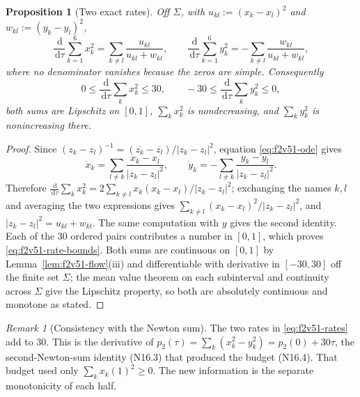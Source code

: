 \documentclass[11pt]{article}
\newtheorem{proposition}[theorem]{Proposition}
\theoremstyle{definition}
\theoremstyle{remark}
\newtheorem{remark}[theorem]{Remark}
\newcommand{\dd}{\,\mathrm d}
\begin{document}
\begin{proposition}[Two exact rates]
\label{prop:f2v51-rates}
Off \(\Sigma\), with \(u_{kl}:=(x_k-x_l)^2\) and \(w_{kl}:=(y_k-y_l)^2\),
\begin{equation}
 \frac{\dd}{\dd\tau}\sum_{k=1}^6x_k^2
 =\sum_{k\ne l}\frac{u_{kl}}{u_{kl}+w_{kl}},
 \qquad
 \frac{\dd}{\dd\tau}\sum_{k=1}^6y_k^2
 =-\sum_{k\ne l}\frac{w_{kl}}{u_{kl}+w_{kl}},
 \label{eq:f2v51-rates}
\end{equation}
where no denominator vanishes because the zeros are simple.
Consequently
\begin{equation}
 0\le\frac{\dd}{\dd\tau}\sum_kx_k^2\le30,
 \qquad
 -30\le\frac{\dd}{\dd\tau}\sum_ky_k^2\le0,
 \label{eq:f2v51-rate-bounds}
\end{equation}
both sums are Lipschitz on \([0,1]\), \(\sum_kx_k^2\) is nondecreasing,
and \(\sum_ky_k^2\) is nonincreasing there.
\end{proposition}

\begin{proof}
Since \((z_k-z_l)^{-1}=(\overline{z_k}-\overline{z_l})/|z_k-z_l|^2\),
equation \eqref{eq:f2v51-ode} gives
\[
 \dot x_k=\sum_{l\ne k}\frac{x_k-x_l}{|z_k-z_l|^2},
 \qquad
 \dot y_k=-\sum_{l\ne k}\frac{y_k-y_l}{|z_k-z_l|^2}.
\]
Therefore
\(\frac{\dd}{\dd\tau}\sum_kx_k^2
 =2\sum_{k\ne l}x_k(x_k-x_l)/|z_k-z_l|^2\); exchanging the names
\(k,l\) and averaging the two expressions gives
\(\sum_{k\ne l}(x_k-x_l)^2/|z_k-z_l|^2\), and
\(|z_k-z_l|^2=u_{kl}+w_{kl}\).  The same computation with \(y\) gives
the second identity.  Each of the \(30\) ordered pairs contributes a
number in \([0,1]\), which proves \eqref{eq:f2v51-rate-bounds}.  Both
sums are continuous on \([0,1]\) by
Lemma~\ref{lem:f2v51-flow}(iii) and differentiable with derivative in
\([-30,30]\) off the finite set \(\Sigma\); the mean value theorem on each
subinterval and continuity across \(\Sigma\) give the Lipschitz property,
so both are absolutely continuous and monotone as stated.
\end{proof}

\begin{remark}[Consistency with the Newton sum]
The two rates in \eqref{eq:f2v51-rates} add to \(30\).  This is the
derivative of \(p_2(\tau)=\sum_k(x_k^2-y_k^2)=p_2(0)+30\tau\), the
second-Newton-sum identity \textup{(N16.3)} that produced the budget
\textup{(N16.4)}.  That budget used only \(\sum_kx_k(1)^2\ge0\).  The new
information is the separate monotonicity of each half.
\end{remark}
\end{document}
